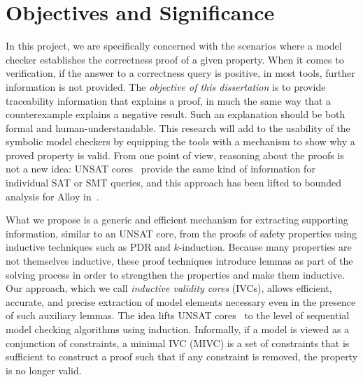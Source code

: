 
\section{Objectives and Significance}
\label{sec:obj}
In this project, we are specifically concerned with the scenarios where a model checker establishes the correctness proof of a given property.
 When it comes to verification, if the answer to a correctness query is positive, in most tools,
further information is not provided.  The \textit{objective of this dissertation} is to provide traceability information that explains a proof, in much the same way that a counterexample explains a negative result.
Such an explanation should be both formal and human-understandable. This research will add to the usability of the symbolic model checkers by equipping the tools with a mechanism to show why a proved property is valid. From one point of view, reasoning about the proofs is not a new idea: UNSAT cores~\cite{zhang2003extracting}
provide the same kind of information for individual SAT or
SMT queries, and this approach has been lifted to bounded analysis
for Alloy in~\cite{Torlak08:cores}.

What we propose is a generic and efficient
mechanism for extracting supporting information, similar to an UNSAT
core, from the proofs of safety properties using inductive techniques
such as PDR and $k$-induction. Because many
properties are not themselves inductive, these proof techniques
introduce lemmas as part of the solving process in order to strengthen
the properties and make them inductive. Our approach, which we call {\em inductive validity cores} (IVCs), allows efficient, accurate, and precise extraction of model elements necessary even in the presence of such auxiliary lemmas. The idea lifts UNSAT cores~\cite{zhang2003extracting}
to the level of sequential model checking algorithms using induction.  Informally, if a model is viewed as a conjunction of constraints,
a minimal IVC (MIVC) is a set of constraints that is sufficient to construct a proof such that if any constraint is removed, the property is no longer valid.


